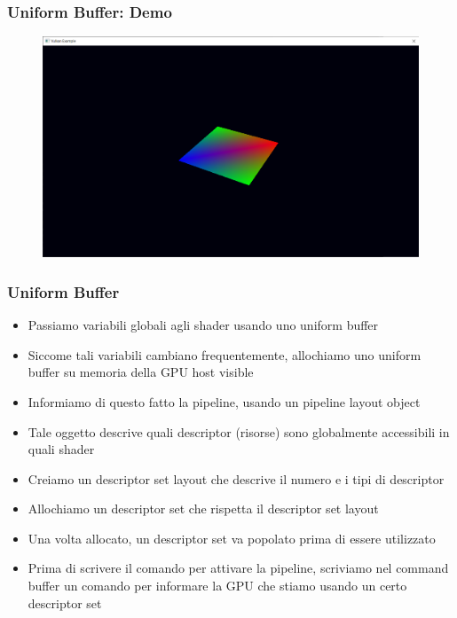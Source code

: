 \begin{frame}
\frametitle{Uniform Buffer: Demo}
\begin{figure}[ht]
    \centering
    \includegraphics[scale=0.25]{images/SlidesUniforms/RenderQuad.png}
\end{figure}
\end{frame}

\begin{frame}
\frametitle{Uniform Buffer}
\begin{itemize}
\item Passiamo variabili globali agli shader usando uno uniform buffer
\item Siccome tali variabili cambiano frequentemente, allochiamo uno uniform buffer su memoria della GPU host visible
\item Informiamo di questo fatto la pipeline, usando un pipeline layout object
\item Tale oggetto descrive quali descriptor (risorse) sono globalmente accessibili in quali shader
\item Creiamo un descriptor set layout che descrive il numero e i tipi di descriptor
\item Allochiamo un descriptor set che rispetta il descriptor set layout
\item Una volta allocato, un descriptor set va popolato prima di essere utilizzato
\item Prima di scrivere il comando per attivare la pipeline, scriviamo nel command buffer un comando per informare la GPU che stiamo usando un certo descriptor set
\end{itemize}
\end{frame}
